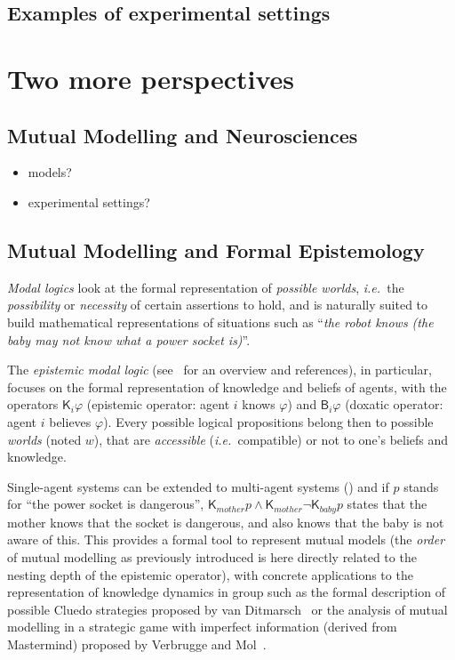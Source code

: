 \documentclass{sig-alternate}
\newcommand{\ie}{{\textit{i.e.~}}}
\begin{document}
\subsection{Examples of experimental settings}

\section{Two more perspectives}

\subsection{Mutual Modelling and Neurosciences}

\begin{itemize}
    \item models?
    \item experimental settings?
\end{itemize}


\subsection{Mutual Modelling and Formal Epistemology}
\label{formal-epistemology}

\emph{Modal logics} look at the formal representation of \emph{possible
worlds}, \ie the \emph{possibility} or \emph{necessity} of certain assertions
to hold, and is naturally suited to build mathematical representations of
situations such as ``\emph{the robot knows (the baby may not know what a power
socket is)}''.

The \emph{epistemic modal logic} (see~\cite{hendricks2008epistemic} for an
overview and references), in particular, focuses on the formal representation of
knowledge and beliefs of agents, with the operators $\mathsf{K}_{i}\varphi$
(epistemic operator: agent $i$ knows $\varphi$) and $\mathsf{B}_{i}\varphi$
(doxatic operator: agent $i$ believes $\varphi$). Every possible logical
propositions belong then to possible \emph{worlds} (noted $w$), that are
\emph{accessible} (\ie compatible) or not to one's beliefs and knowledge.

Single-agent systems can be extended to multi-agent systems (\cite[chapt.
4]{fagin1995reasoning}) and if $p$ stands for ``the power socket is dangerous'',
$\mathsf{K}_{mother}p \wedge \mathsf{K}_{mother}\neg\mathsf{K}_{baby}p$ states
that the mother knows that the socket is dangerous, and also knows that the baby
is not aware of this. This provides a formal tool to represent mutual models
(the \emph{order} of mutual modelling as previously introduced is here directly
related to the nesting depth of the epistemic operator), with concrete
applications to the representation of knowledge dynamics in group such as the
formal description of possible Cluedo strategies proposed by van
Ditmarsch~\cite{ditmarsch2002description} or the analysis of mutual modelling in
a strategic game with imperfect information (derived from Mastermind) proposed
by Verbrugge and Mol~\cite{verbrugge2008learning}.
\end{document}
